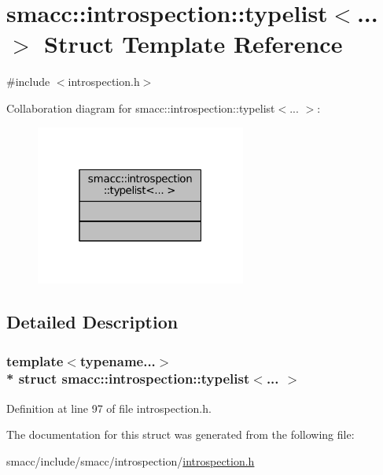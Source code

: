 \hypertarget{structsmacc_1_1introspection_1_1typelist}{}\section{smacc\+:\+:introspection\+:\+:typelist$<$... $>$ Struct Template Reference}
\label{structsmacc_1_1introspection_1_1typelist}


{\ttfamily \#include $<$introspection.\+h$>$}



Collaboration diagram for smacc\+:\+:introspection\+:\+:typelist$<$... $>$\+:
\nopagebreak
\begin{figure}[H]
\begin{center}
\leavevmode
\includegraphics[width=196pt]{structsmacc_1_1introspection_1_1typelist__coll__graph}
\end{center}
\end{figure}


\subsection{Detailed Description}
\subsubsection*{template$<$typename...$>$\\*
struct smacc\+::introspection\+::typelist$<$... $>$}



Definition at line 97 of file introspection.\+h.



The documentation for this struct was generated from the following file\+:\begin{DoxyCompactItemize}
\item 
smacc/include/smacc/introspection/\hyperlink{introspection_8h}{introspection.\+h}\end{DoxyCompactItemize}
